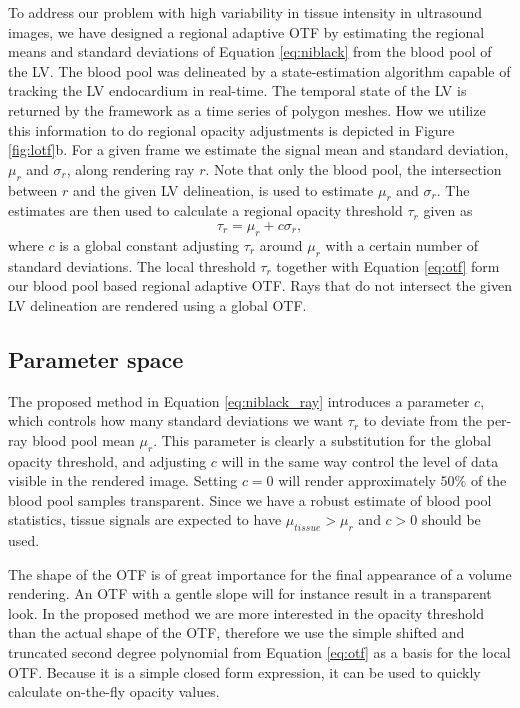 To address our problem with high variability in tissue intensity in ultrasound images, we have designed a regional adaptive OTF by estimating the regional means and standard deviations of Equation \ref{eq:niblack} from the blood pool of the LV. The blood pool was delineated by a state-estimation algorithm capable of tracking the LV endocardium in real-time\cite{orderud2006}. The temporal state of the LV is returned by the framework as a time series of polygon meshes. How we utilize this information to do regional opacity adjustments is depicted in Figure \ref{fig:lotf}b. For a given frame we estimate the signal mean and standard deviation, $\mu_r$ and $\sigma_r$, along rendering ray $r$. Note that only the blood pool, the intersection between $r$ and the given LV delineation, is used to estimate $\mu_r$ and $\sigma_r$. The estimates are then used to calculate a regional opacity threshold $\tau_r$ given as
\begin{equation}
\tau_r=\mu_r+c\sigma_r, 
\label{eq:niblack_ray}
\end{equation}
where $c$ is a global constant adjusting $\tau_r$ around $\mu_r$ with a certain number of standard deviations. The local threshold $\tau_r$ together with Equation \ref{eq:otf} form our blood pool based regional adaptive OTF. Rays that do not intersect the given LV delineation are rendered using a global OTF.  


\subsection{Parameter space}
The proposed method in Equation \ref{eq:niblack_ray} introduces a parameter $c$, which controls how many standard deviations we want $\tau_r$ to deviate from the per-ray blood pool mean $\mu_r$. This parameter is clearly a substitution for the global opacity threshold, and adjusting $c$ will in the same way control the level of data visible in the rendered image. Setting $c = 0$ will render approximately $50\%$ of the blood pool samples transparent. Since we have a robust estimate of blood pool statistics, tissue signals are expected to have $\mu_{tissue} > \mu_r$ and $c > 0$ should be used.

The shape of the OTF is of great importance for the final appearance of a volume rendering. An OTF with a gentle slope will for instance result in a transparent look. In the proposed method we are more interested in the opacity threshold than the actual shape of the OTF, therefore we use the simple shifted and truncated second degree polynomial from Equation \ref{eq:otf} as a basis for the local OTF. Because it is a simple closed form expression, it can be used to quickly calculate on-the-fly opacity values.

